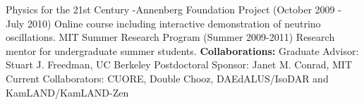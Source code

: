 Physics for the 21st Century -Annenberg Foundation Project (October 2009 - July 2010)
\newline \noindent
Online course including interactive demonstration of neutrino oscillations.
\newline\newline \noindent
MIT Summer Research Program (Summer 2009-2011)
\newline \noindent
Research mentor for undergraduate summer students.
\newline\newline \noindent
{\bf  Collaborations:}
\newline \noindent
Graduate Advisor: Stuart J. Freedman, UC Berkeley
\newline \noindent
Postdoctoral Sponsor: Janet M. Conrad, MIT
\newline \noindent
Current Collaborators:
\newline \noindent
CUORE, Double Chooz, DAEdALUS/IsoDAR and KamLAND/KamLAND-Zen



